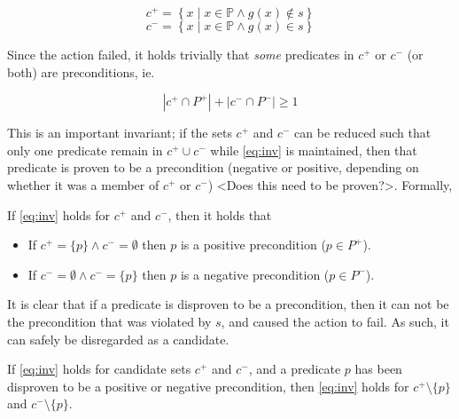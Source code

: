 \documentclass[../Master.tex]{subfiles}
\begin{document}
\begin{equation} \label{eq:cPlus}
    c^+ = \left\{ x \; | \; x \in \mathbb{P} \land g(x) \notin s \right\}
\end{equation}
\begin{equation} \label{eq:cMinus}
    c^- = \left\{ x \; | \; x \in \mathbb{P} \land g(x) \in s \right\}
\end{equation}

Since the action failed, it holds trivially that \textit{some} predicates in $c^+$ or $c^-$ (or both) are preconditions, ie.

\begin{equation} \label{eq:inv}
    \left| c^+ \cap P^+ \right| + \left| c^- \cap P^- \right| \geq 1
\end{equation}

This is an important invariant; if the sets $c^+$ and $c^-$ can be reduced such that only one predicate remain in $c^+ \cup c^-$ while \eqref{eq:inv} is maintained, then that predicate is proven to be a precondition (negative or positive, depending on whether it was a member of $c^+$ or $c^-$) <Does this need to be proven?>. Formally,
\begin{theorem} \label{th:precondProof}
    If \eqref{eq:inv} holds for $c^+$ and $c^-$, then it holds that
    \begin{itemize}
        \item If $c^+ = \{p\} \land c^- = \emptyset$ then $p$ is a positive precondition ($p \in P^+$).
        \item If $c^- = \emptyset \land c^- = \{p\}$ then $p$ is a negative precondition ($p \in P^-$).
    \end{itemize}
\end{theorem}

It is clear that if a predicate is disproven to be a precondition, then it can not be the precondition that was violated by $s$, and caused the action to fail. As such, it can safely be disregarded as a candidate.

\begin{theorem} \label{th:invHolds}
    If \eqref{eq:inv} holds for candidate sets $c^+$ and $c^-$, and a predicate $p$ has been disproven to be a positive or negative precondition, then \eqref{eq:inv} holds for $c^+ \setminus \{ p \}$ and $c^- \setminus \{ p \}$.
\end{theorem}
\end{document}
